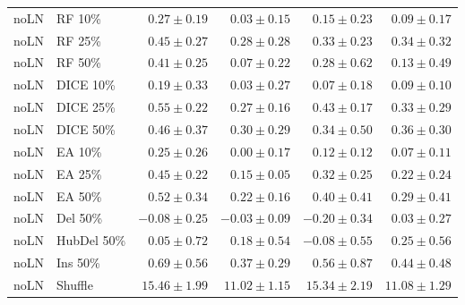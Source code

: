 {\begin{longtable}{llrrrr}
noLN & RF 10\% & $0.27\pm0.19$ & $0.03\pm0.15$ & $0.15\pm0.23$ & $0.09\pm0.17$ \\
noLN & RF 25\% & $0.45\pm0.27$ & $0.28\pm0.28$ & $0.33\pm0.23$ & $0.34\pm0.32$ \\
noLN & RF 50\% & $0.41\pm0.25$ & $0.07\pm0.22$ & $0.28\pm0.62$ & $0.13\pm0.49$ \\
noLN & DICE 10\% & $0.19\pm0.33$ & $0.03\pm0.27$ & $0.07\pm0.18$ & $0.09\pm0.10$ \\
noLN & DICE 25\% & $0.55\pm0.22$ & $0.27\pm0.16$ & $0.43\pm0.17$ & $0.33\pm0.29$ \\
noLN & DICE 50\% & $0.46\pm0.37$ & $0.30\pm0.29$ & $0.34\pm0.50$ & $0.36\pm0.30$ \\
noLN & EA 10\% & $0.25\pm0.26$ & $0.00\pm0.17$ & $0.12\pm0.12$ & $0.07\pm0.11$ \\
noLN & EA 25\% & $0.45\pm0.22$ & $0.15\pm0.05$ & $0.32\pm0.25$ & $0.22\pm0.24$ \\
noLN & EA 50\% & $0.52\pm0.34$ & $0.22\pm0.16$ & $0.40\pm0.41$ & $0.29\pm0.41$ \\
noLN & Del 50\% & $-0.08\pm0.25$ & $-0.03\pm0.09$ & $-0.20\pm0.34$ & $0.03\pm0.27$ \\
noLN & HubDel 50\% & $0.05\pm0.72$ & $0.18\pm0.54$ & $-0.08\pm0.55$ & $0.25\pm0.56$ \\
noLN & Ins 50\% & $0.69\pm0.56$ & $0.37\pm0.29$ & $0.56\pm0.87$ & $0.44\pm0.48$ \\
noLN & Shuffle & $15.46\pm1.99$ & $11.02\pm1.15$ & $15.34\pm2.19$ & $11.08\pm1.29$ \\
\end{longtable}
}
